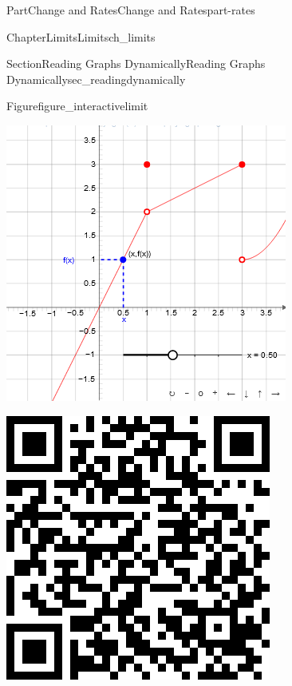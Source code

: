 \documentclass{tufte-book}
\numberwithin{equation}{chapter}
\begin{document}
\begin{partptx}{Part}{Change and Rates}{}{Change and Rates}{}{}{part-rates}
\begin{chapterptx}{Chapter}{Limits}{}{Limits}{}{}{ch_limits}
\begin{sectionptx}{Section}{Reading Graphs Dynamically}{}{Reading Graphs Dynamically}{}{}{sec_readingdynamically}
\begin{figureptx}{Figure}{}{figure_interactivelimit}{}
\begin{sidebyside}{2}{0.075}{0.075}{0.17}
\begin{sbspanel}{0.47}
\includegraphics[width=\linewidth]{external/jsxgraph-limitpicewise.png}
\end{sbspanel}%
\begin{sbspanel}{0.21}%
\includegraphics[width=\linewidth]{generated/qrcode/figure_interactivelimit-2.png}

\end{sbspanel}
\end{sidebyside}
\end{figureptx}
\end{sectionptx}
\end{chapterptx}
\end{partptx}
\end{document}
